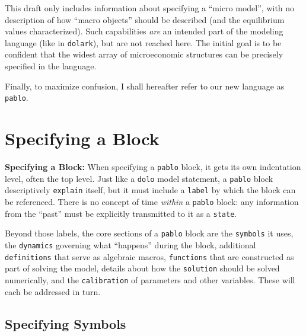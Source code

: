\documentclass[12pt,pdftex,letterpaper]{article}
\begin{document}
This draft only includes information about specifying a ``micro model'', with no description of how ``macro objects'' should be described (and the equilibrium values characterized). Such capabilities \textit{are} an intended part of the modeling language (like in \texttt{dolark}), but are not reached here. The initial goal is to be confident that the widest array of microeconomic structures can be precisely specified in the language.

Finally, to maximize confusion, I shall hereafter refer to our new language as \texttt{pablo}.


\section{Specifying a Block}

\noindent \textbf{Specifying a Block:} When specifying a \texttt{pablo} block, it gets its own indentation level, often the top level. Just like a \texttt{dolo} model statement, a \texttt{pablo} block descriptively \texttt{explain} itself, but it must include a \texttt{label} by which the block can be referenced. There is no concept of time \textit{within} a \texttt{pablo} block: any information from the ``past'' must be explicitly transmitted to it as a \texttt{state}.

Beyond those labels, the core sections of a \texttt{pablo} block are the \texttt{symbols} it uses, the \texttt{dynamics} governing what ``happens'' during the block, additional \texttt{definitions} that serve as algebraic macros, \texttt{functions} that are constructed as part of solving the model, details about how the \texttt{solution} should be solved numerically, and the \texttt{calibration} of parameters and other variables. These will each be addressed in turn.

\subsection{Specifying Symbols}
\end{document}
